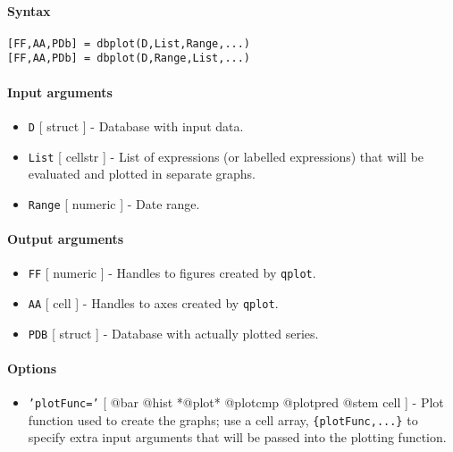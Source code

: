 


	\paragraph{Syntax}\label{syntax}

\begin{verbatim}
[FF,AA,PDb] = dbplot(D,List,Range,...)
[FF,AA,PDb] = dbplot(D,Range,List,...)
\end{verbatim}

\paragraph{Input arguments}\label{input-arguments}

\begin{itemize}
\item
  \texttt{D} {[} struct {]} - Database with input data.
\item
  \texttt{List} {[} cellstr {]} - List of expressions (or labelled
  expressions) that will be evaluated and plotted in separate graphs.
\item
  \texttt{Range} {[} numeric {]} - Date range.
\end{itemize}

\paragraph{Output arguments}\label{output-arguments}

\begin{itemize}
\item
  \texttt{FF} {[} numeric {]} - Handles to figures created by
  \texttt{qplot}.
\item
  \texttt{AA} {[} cell {]} - Handles to axes created by \texttt{qplot}.
\item
  \texttt{PDB} {[} struct {]} - Database with actually plotted series.
\end{itemize}

\paragraph{Options}\label{options}

\begin{itemize}
\itemsep1pt\parskip0pt
\item
  \texttt{'plotFunc='} {[} @bar \textbar{} @hist \textbar{} *@plot*
  \textbar{} @plotcmp \textbar{} @plotpred \textbar{} @stem \textbar{}
  cell {]} - Plot function used to create the graphs; use a cell array,
  \texttt{\{plotFunc,...\}} to specify extra input arguments that will
  be passed into the plotting function.
\end{itemize}

